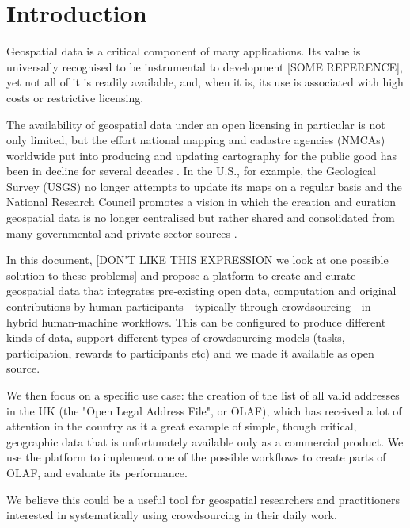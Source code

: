 \section{Introduction}

Geospatial data is a critical component of many applications. Its value is universally recognised to be instrumental to development [SOME REFERENCE], yet not all of it is readily available, and, when it is, its use is associated with high costs or restrictive licensing. 

The availability of geospatial data under an open licensing in particular is not only limited, but the effort national mapping and cadastre agencies (NMCAs) worldwide put into producing and updating cartography for the public good has been in decline for several decades \cite{ESTES:1994vz}. In the U.S., for example, the Geological Survey (USGS) no longer attempts to update its maps on a regular basis and the National Research Council promotes a vision in which the creation and curation geospatial data is no longer centralised but rather shared and consolidated from many governmental and private sector sources \cite{Committee:1993vp}.

In this document, [DON'T LIKE THIS EXPRESSION we look at one possible solution to these problems] and propose a platform to create and curate geospatial data that integrates pre-existing open data, computation and original contributions by human participants - typically through crowdsourcing - in hybrid human-machine workflows. This can be configured to produce different kinds of data, support different types of crowdsourcing models (tasks, participation, rewards to participants etc) and we made it available as open source.

We then focus on a specific use case: the creation of the list of all valid addresses in the UK (the "Open Legal Address File", or OLAF), which has received a lot of attention in the country as it a great example of simple, though critical, geographic data that is unfortunately available only as a commercial product. We use the platform to implement one of the possible workflows to create parts of OLAF, and evaluate its performance. 

We believe this could be a useful tool for geospatial researchers and practitioners interested in systematically using crowdsourcing in their daily work.
